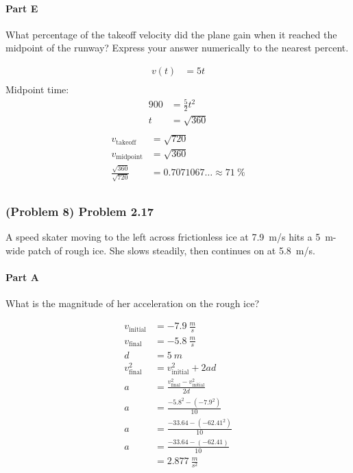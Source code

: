 \paragraph{Part E}
What percentage of the takeoff velocity did the plane gain when it reached the midpoint of the runway? Express your answer numerically to the nearest percent.

\begin{solution}
	\begin{align*}
		v(t) &= 5t \\
	\end{align*}
	Midpoint time:
	\begin{align*}
		900 &= \frac{5}{2}t^2 \\
		t &= \sqrt{360} \\
	\end{align*}
	\begin{align*}
		v_{\mathrm{takeoff}} &= \sqrt{720} \\
		v_{\mathrm{midpoint}} &= \sqrt{360} \\
		\frac{\sqrt{360}}{\sqrt{720}} &= 0.7071067\ldots \approx \SI{71}{\percent} \\
	\end{align*}
\end{solution}

\newpage

\subsubsection{(Problem 8) Problem 2.17}
A speed skater moving to the left across frictionless ice at \SI{7.9}{m/s} hits a \SI{5}{m}-wide patch of rough ice. She slows steadily, then continues on at \SI{5.8}{m/s}.

\paragraph{Part A}
What is the magnitude of her acceleration on the rough ice?

\begin{solution}
	\begin{align*}
		v_{\mathrm{initial}} &= \SI{-7.9}{\frac{m}{s}} \\
		v_{\mathrm{final}} &= \SI{-5.8}{\frac{m}{s}} \\
		d &= \SI{5}{m} \\
		v_{\mathrm{final}}^2 &= v_{\mathrm{initial}}^2 + 2ad \\
		a &= \frac{v_{\mathrm{final}}^2 - v_{\mathrm{initial}}^2}{2d} \\
		a &= \frac{-5.8^2- \left( -7.9^2 \right)}{10} \\
		a &= \frac{-33.64 - \left( -62.41^2 \right)}{10} \\
		a &= \frac{-33.64 - \left( -62.41 \right)}{10} \\
		&= \boxed{\SI{2.877}{\frac{m}{s^2}}}
	\end{align*}
\end{solution}

